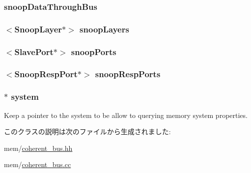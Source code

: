 \label{classCoherentBus_a2f42dda70e78f1e5e9574f11b465d173}
\hypertarget{classCoherentBus_a576c4936ce7bed70cd1751024670e75f}{
\subsubsection[{snoopDataThroughBus}]{ {\bf snoopDataThroughBus}}}
\label{classCoherentBus_a576c4936ce7bed70cd1751024670e75f}
\hypertarget{classCoherentBus_ae6f8cf70846d8ee4b2314816863efbca}{
\subsubsection[{snoopLayers}]{$<${\bf SnoopLayer}$\ast$$>$ {\bf snoopLayers}}}
\label{classCoherentBus_ae6f8cf70846d8ee4b2314816863efbca}
\hypertarget{classCoherentBus_acdbc947756de5f5071b88ce0702d557d}{
\subsubsection[{snoopPorts}]{$<${\bf SlavePort}$\ast$$>$ {\bf snoopPorts}}}
\label{classCoherentBus_acdbc947756de5f5071b88ce0702d557d}
\hypertarget{classCoherentBus_ae876574c554fa099bcd063e2e188b95b}{
\subsubsection[{snoopRespPorts}]{$<${\bf SnoopRespPort}$\ast$$>$ {\bf snoopRespPorts}}}
\label{classCoherentBus_ae876574c554fa099bcd063e2e188b95b}
\hypertarget{classCoherentBus_af27ccd765f13a4b7bd119dc7579e2746}{
\subsubsection[{system}]{$\ast$ {\bf system}}}
\label{classCoherentBus_af27ccd765f13a4b7bd119dc7579e2746}
Keep a pointer to the system to be allow to querying memory system properties. 

このクラスの説明は次のファイルから生成されました:\begin{DoxyCompactItemize}
\item 
mem/\hyperlink{coherent__bus_8hh}{coherent\_\-bus.hh}\item 
mem/\hyperlink{coherent__bus_8cc}{coherent\_\-bus.cc}\end{DoxyCompactItemize}
